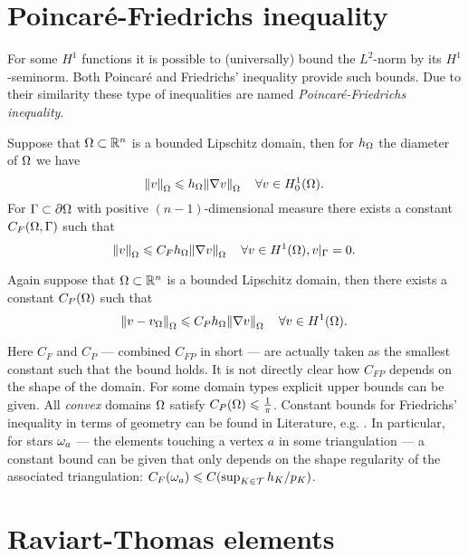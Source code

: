 \documentclass[thesis.tex]{subfiles}
\begin{document}
\section{Poincar\'e-Friedrichs inequality}
\label{sec:poincfried}
For some $H^1$ functions it is possible to (universally) bound the $L^2$-norm by its $H^1$-seminorm.
Both Poincar\'e and Friedrichs' inequality provide such bounds. Due to their similarity these type 
of inequalities are named \emph{Poincar\'e-Friedrichs inequality}.
\begin{thm}
  Suppose that $\Omega \subset \mathbb{R}^n$ is a  bounded Lipschitz domain, then for $h_\Omega$ the diameter of $\Omega$ we have
  \[
    \norm{v}_{\Omega} \leqslant h_\Omega  \norm{\nabla v}_{\Omega} \quad \forall v \in H^1_{0}(\Omega).
  \]
  For $\Gamma \subset \partial \Omega$ with positive $(n-1)$-dimensional measure there exists
  a constant $C_F(\Omega, \Gamma)$ such that
  \[
    \norm{v}_{\Omega} \leqslant C_{F} h_\Omega \norm{\nabla v}_{\Omega} \quad \forall v \in H^1(\Omega), v|_{\Gamma} = 0.
  \]
\end{thm}
\begin{thm}
  Again suppose that $\Omega \subset \mathbb{R}^n$ is a bounded Lipschitz domain, then there exists a constant $C_P(\Omega)$ such that
  \[
    \norm{v - v_{\Omega}}_{\Omega} \leqslant C_Ph_\Omega \norm{\nabla v}_{\Omega} \quad \forall v \in H^1(\Omega).
  \]
\end{thm}
Here $C_F$ and $C_P$ --- combined $C_{FP}$ in short --- are actually taken as the smallest constant such that the bound holds.
It is not directly clear how $C_{FP}$ depends on the shape of the domain. For some domain types explicit
upper bounds can be given. All \emph{convex} domains $\Omega$  satisfy $C_{P}(\Omega) \leqslant \frac{1}{\pi}$.
Constant bounds for Friedrichs' inequality in terms of geometry can be found in Literature,
e.g. \cite{zheng2005friedrichs, veeser2011poincare}. In particular, for stars $\omega_a$  --- the elements touching
a vertex $a$ in some triangulation --- a constant bound can be given that only depends on the shape regularity of 
the associated triangulation: $C_{F}(\omega_a) \leqslant C(\sup_{K \in \mathcal{T}} h_K / p_K)$.

\section{Raviart-Thomas elements}
\end{document}

